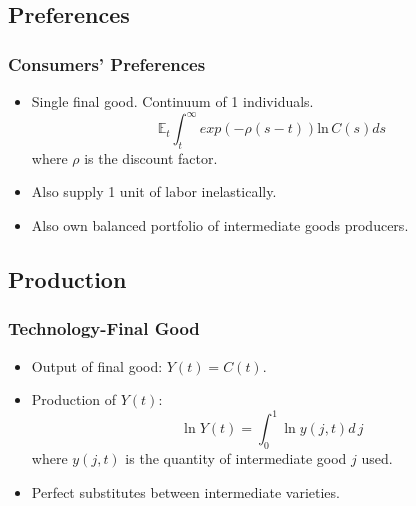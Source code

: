 \documentclass{beamer}
\begin{document}
\subsection{Preferences}
\label{sub:preferences}

\begin{frame}[t]\frametitle{Consumers' Preferences} 
  \begin{itemize}
    \item<+-> Single final good.  Continuum of 1 individuals.
      \begin{equation*} \label{eq:pref}
        \mathbb{E}_t \int_t^\infty exp(-\rho(s - t))\mathrm{ln}\,   C(s)ds
      \end{equation*}
      where $\rho$ is the discount factor.
      
  \item<+-> Also supply 1 unit of labor inelastically.
  \item<+-> Also own balanced portfolio of intermediate goods producers.
  \end{itemize}
\end{frame}

\subsection{Production}
\label{sub:production}

\begin{frame}[t]\frametitle{Technology-Final Good} 
  \begin{itemize}
    \item<+-> Output of final good: $Y(t) = C(t)$.
    
    \item<+-> Production of $Y(t)$:
      \begin{equation*} \label{eq:tech_output}
        \ln Y(t) = \int_{0}^{1} \ln y(j, t) d\,j 
      \end{equation*}
      where $y(j, t)$ is the quantity of intermediate good $j$ used.
    \item<+-> Perfect substitutes between intermediate varieties.
    
  \end{itemize}
\end{frame}
\end{document}
